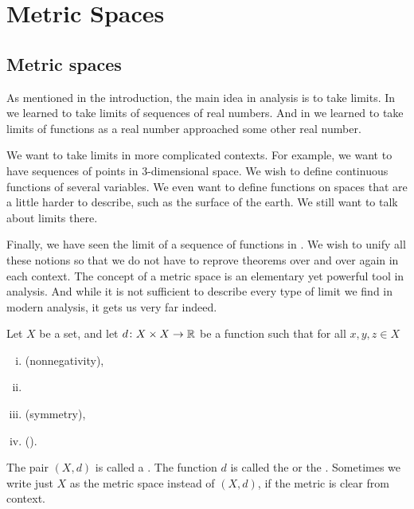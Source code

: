 \chapter{Metric Spaces} \label{ms:chapter}


\section{Metric spaces}
\label{sec:metric}


As mentioned in the introduction, the main idea in analysis is to take
limits.  In  we learned to take limits of sequences of
real numbers.  And in  we learned to take limits
of functions as a real number approached some other real number.

We want to take limits in more complicated contexts.  For
example, we want to have sequences of points in 3-dimensional space.
We wish to define continuous functions of several variables.
We even want to define functions on spaces that are a little harder to
describe, such as the surface of the earth.  We still want to talk about
limits there.

Finally, we have seen the limit of a sequence of
functions in .
We wish to unify all these notions so that we do not have to
reprove theorems over and over again in each context.  The concept of a
metric space is an elementary yet powerful tool in analysis.  And while it
is not sufficient to describe every type of limit we find in modern
analysis, it gets us very far indeed.

\begin{defn}
Let $X$ be a set, and let
$d \colon X \times X \to {\mathbb{R}}$
be a function such that for all $x,y,z \in X$
\begin{enumerate}[(i)]
%
\item \label{metric:pos}
(nonnegativity),
%
\item \label{metric:zero}
%
\item \label{metric:com}
(symmetry),
%
\item \label{metric:triang}
(\emph{}).
\end{enumerate}
The pair $(X,d)$ is called a \emph{}.  The
function $d$ is called the \emph{} or the
\emph{}.
Sometimes we write just $X$ as the metric space instead of $(X,d)$, if the metric is clear from
context.
\end{defn}


